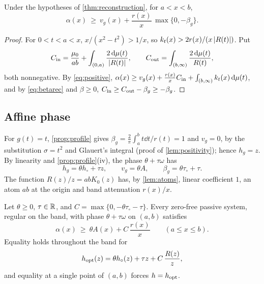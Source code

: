\begin{corollary}\label{cor:compare}
Under the hypotheses of \cref{thm:reconstruction}, for $a<x<b$,
\[
\alpha(x)\ \ge\ v_g(x)+\frac{r(x)}x\,\max\{0,-\beta_g\}.
\]
\end{corollary}

\begin{proof}
For $0<t<a<x$, $x/(x^2-t^2)>1/x$, so $k_t(x)>2r(x)/(x\left|R(t)\right|)$. Put
\[
C_{\rm in}=\frac{\mu_0}{ab}+\int_{(0,a)}\frac{2\,\mathrm d\mu(t)}{\left|R(t)\right|},\qquad
C_{\rm out}=\int_{(b,\infty)}\frac{2\,\mathrm d\mu(t)}{R(t)} ,
\]
both nonnegative. By \eqref{eq:positive},
$\alpha(x)\ge v_g(x)+\frac{r(x)}xC_{\rm in}+\int_{(b,\infty)}k_t(x)\,\mathrm d\mu(t)$,
and by \eqref{eq:betarec} and $\beta\ge0$,
$C_{\rm in}\ge C_{\rm out}-\beta_g\ge-\beta_g$.
\end{proof}

\subsection{Affine phase}

For $g(t)=t$, \cref{prop:profile} gives $\beta_g=\frac2\pi\int_a^bt\dd t/r(t)=1$
and $v_g=0$, by the substitution $\sigma=t^2$ and Glauert's integral (proof
of \cref{lem:positivity}); hence $h_g=z$. By linearity and
\cref{prop:profile}(iv), the phase $\theta+\tau\omega$ has
\begin{equation}\label{eq:affinehg}
h_g=\theta h_\circ+\tau z,\qquad v_g=\theta A,\qquad \beta_g=\theta\tau_\circ+\tau .
\end{equation}
The function $R(z)/z=abK_0(z)$ has, by \cref{lem:atoms}, linear coefficient
$1$, an atom $ab$ at the origin and band attenuation $r(x)/x$.

\begin{theorem}\label{thm:affine}
Let $\theta\ge0$, $\tau\in\mathbb R$, and $C=\max\{0,-\theta\tau_\circ-\tau\}$. Every
zero-free passive system, regular on the band, with phase $\theta+\tau\omega$
on $(a,b)$ satisfies
\begin{equation}\label{eq:affinebound}
\alpha(x)\ \ge\ \theta A(x)+C\,\frac{r(x)}x\qquad(a\le x\le b).
\end{equation}
Equality holds throughout the band for
\[
h_{\rm opt}(z)=\theta h_\circ(z)+\tau z+C\,\frac{R(z)}z ,
\]
and equality at a single point of $(a,b)$ forces $h=h_{\rm opt}$.
\end{theorem}

